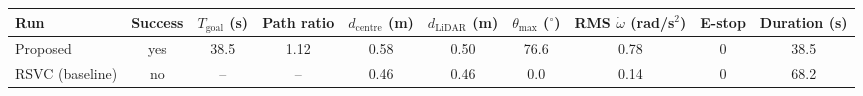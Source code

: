 \begin{tabular}{@{}lccccccccc@{}}
\toprule
\textbf{Run} & \textbf{Success} & $T_{\mathrm{goal}}$ (s) & \textbf{Path ratio} & $d_{\mathrm{centre}}$ (m) & $d_{\mathrm{LiDAR}}$ (m) & $\theta_{\max}$ ($^\circ$) & RMS $\dot\omega$ (rad/s$^2$) & \textbf{E-stop} & \textbf{Duration} (s) \\
\midrule
Proposed & yes & 38.5 & 1.12 & 0.58 & 0.50 & 76.6 & 0.78 & 0 & 38.5 \\
RSVC (baseline) & no & -- & -- & 0.46 & 0.46 & 0.0 & 0.14 & 0 & 68.2 \\
\bottomrule
\end{tabular}
